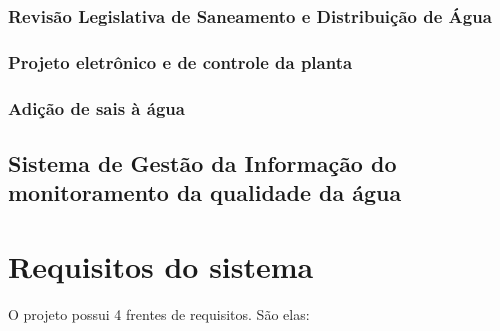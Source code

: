       \subsubsection{Revisão Legislativa de Saneamento e Distribuição de Água}
      	
        
      \subsubsection{Projeto eletrônico e de controle da planta}
        
        
      
      \subsubsection{Adição de sais à água}
      
	
       
    \pagebreak  
    \subsection{Sistema de Gestão da Informação do monitoramento da qualidade da água}
	
	
      
  \section{Requisitos do sistema}
  
      O projeto possui 4 frentes de requisitos. São elas:
      
